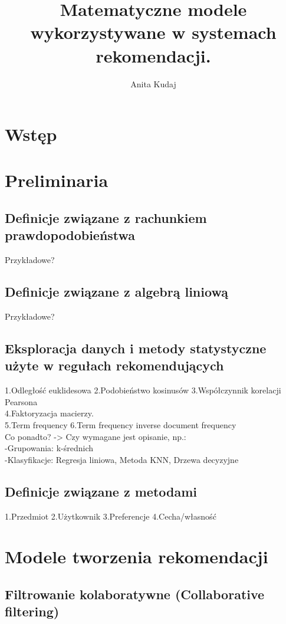 \documentclass[12pt,a4paper]{report}
\author{Anita Kudaj}
\title{Matematyczne modele wykorzystywane w systemach rekomendacji.}
\begin{document}
\maketitle

\tableofcontents

\chapter{Wstęp}
\chapter{Preliminaria} %
\section{Definicje związane z rachunkiem prawdopodobieństwa}
Przykładowe?
\section{Definicje związane z algebrą liniową}
Przykładowe?
\section{Eksploracja danych i metody statystyczne użyte w regułach rekomendujących}
1.Odległość euklidesowa 2.Podobieństwo kosinusów 3.Współczynnik korelacji Pearsona
\\4.Faktoryzacja macierzy. 
\\5.Term frequency 6.Term frequency inverse document frequency
\\Co ponadto? -> Czy wymagane jest opisanie, np.: 
\\-Grupowania: k-średnich
\\-Klasyfikacje: Regresja liniowa, Metoda KNN, Drzewa decyzyjne

\section{Definicje związane z metodami}
1.Przedmiot 2.Użytkownik 3.Preferencje 4.Cecha/własność



\chapter{Modele tworzenia rekomendacji}
\section{Filtrowanie kolaboratywne (Collaborative filtering)}
\end{document}
